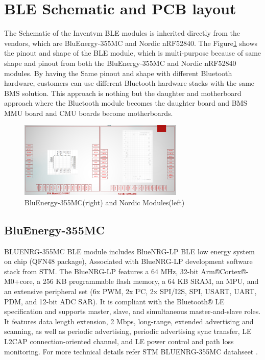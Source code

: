 \section{BLE Schematic and PCB layout}
The Schematic of the Inventvm BLE modules is inherited directly from the vendors, which are BluEnergy-355MC\cite{BLNRG355_STEVAL_GUIDE} and Nordic nRF52840\cite{NORDIC_nrf52840_USERGUIDE}. The Figure\ref{fig:Nordic_ST_modules} shows the pinout and shape of the BLE module, which is multi-purpose because of same shape and pinout from both the BluEnergy-355MC and Nordic nRF52840 modules. By having the Same pinout and shape with different Bluetooth hardware, customers can use different Bluetooth hardware stacks with the same BMS solution. This approach is nothing but the daughter and motherboard approach where the Bluetooth module becomes the daughter board and BMS MMU board and CMU boards become motherboards.

\begin{figure}[h]
	\centering
	\includegraphics[width=0.7\textwidth]{Chap03/Figures/Nordic_ST_modules.PNG}
	\caption{BluEnergy-355MC(right) and Nordic Modules(left) }
	\label{fig:Nordic_ST_modules}
\end{figure}

\subsection{BluEnergy-355MC}
BLUENRG-355MC\cite{BLNRG355_STEVAL_GUIDE} BLE module includes BlueNRG-LP BLE low energy system on chip (QFN48 package), Associated with BlueNRG-LP development software stack from STM. The BlueNRG-LP features a 64 MHz, 32-bit Arm®Cortex®-M0+core, a 256 KB programmable flash memory, a 64 KB SRAM, an MPU, and an extensive peripheral set (6x PWM, 2x I²C, 2x SPI/I2S, SPI, USART, UART, PDM, and 12-bit ADC SAR)\cite{BLNRG355_STEVAL_GUIDE}. It is compliant with the Bluetooth® LE specification and supports master, slave, and simultaneous master-and-slave roles. It features data length extension, 2 Mbps, long-range, extended advertising and scanning, as well as periodic advertising, periodic advertising sync transfer, LE L2CAP connection-oriented channel, and LE power control and path loss monitoring\cite{BLNRG355_STEVAL_GUIDE}.
For more technical details refer STM BLUENRG-355MC datahseet \cite{BLNRG355_STEVAL_GUIDE}.
